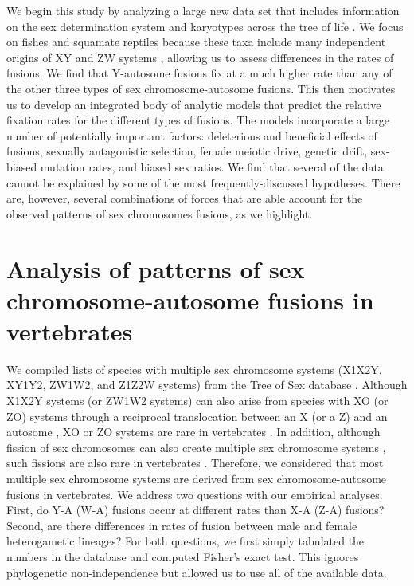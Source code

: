 We begin this study by analyzing a large new data set that includes information on the sex determination system and karyotypes across the tree of life \citep{ToS}. We focus on fishes and squamate reptiles because these taxa include many independent origins of XY and ZW systems \citep{Ezaz2009, Kitano2012}, allowing us to assess differences in the rates of fusions. We find that Y-autosome fusions fix at a much higher rate than any of the other three types of sex chromosome-autosome fusions. This then motivates us to develop an integrated body of analytic models that predict the relative fixation rates for the different types of fusions. The models incorporate a large number of potentially important factors: deleterious and beneficial effects of fusions, sexually antagonistic selection, female meiotic drive, genetic drift, sex-biased mutation rates, and biased sex ratios. We find that several of the data cannot be explained by some of the most frequently-discussed hypotheses. There are, however, several combinations of forces that are able account for the observed patterns of sex chromosomes fusions, as we highlight.

\section{Analysis of patterns of sex chromosome-autosome fusions in vertebrates}

We compiled lists of species with multiple sex chromosome systems (X1X2Y, XY1Y2, ZW1W2, and Z1Z2W systems) from the Tree of Sex database \citep{ToS}. Although X1X2Y systems (or ZW1W2 systems) can also arise from species with XO (or ZO) systems through a reciprocal translocation between an X (or a Z) and an autosome \citep{White1973, Kitano2012}, XO or ZO systems are rare in vertebrates \citep{ToS}. In addition, although fission of sex chromosomes can also create multiple sex chromosome systems \citep{White1973, Kitano2012}, such fissions are also rare in vertebrates \citep{Ohno1967, Kitano2012, Yoshida2012}. Therefore, we considered that most multiple sex chromosome systems are derived from sex chromosome-autosome fusions in vertebrates. We address two questions with our empirical analyses. First, do Y-A (W-A) fusions occur at different rates than X-A (Z-A) fusions? Second, are there differences in rates of fusion between male and female heterogametic lineages? For both questions, we first simply tabulated the numbers in the database and computed Fisher's exact test. This ignores phylogenetic non-independence but allowed us to use all of the available data. 

